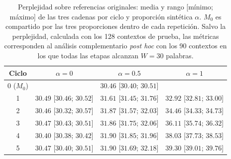 
\begin{table}[ht]
\centering
\footnotesize
\begin{tabular}{c c c c}
\hline
Ciclo & $\alpha=0$ & $\alpha=0.5$ & $\alpha=1$ \\
\hline
0 ($M_0$) & \multicolumn{3}{c}{$30.46$ [$30.40$; $30.51$]} \\
1 & $30.49$ [$30.46$; $30.52$] & $31.61$ [$31.45$; $31.76$] & $32.92$ [$32.81$; $33.00$] \\
2 & $30.46$ [$30.32$; $30.57$] & $31.87$ [$31.57$; $32.03$] & $34.46$ [$34.33$; $34.73$] \\
3 & $30.47$ [$30.43$; $30.51$] & $31.86$ [$31.75$; $32.06$] & $36.11$ [$35.74$; $36.32$] \\
4 & $30.40$ [$30.38$; $30.42$] & $31.90$ [$31.85$; $31.96$] & $38.03$ [$37.73$; $38.53$] \\
5 & $30.47$ [$30.40$; $30.51$] & $31.90$ [$31.69$; $32.18$] & $39.30$ [$39.01$; $39.76$] \\
\hline
\end{tabular}
\caption{Perplejidad sobre referencias originales: media y rango [mínimo; máximo] de las tres cadenas por ciclo y proporción sintética $\alpha$. $M_0$ es compartido por las tres proporciones dentro de cada repetición. Salvo la perplejidad, calculada con los 128 contextos de prueba, las métricas corresponden al análisis complementario \textit{post hoc} con los 90 contextos en los que todas las etapas alcanzan $W=30$ palabras.}
\label{tab:medias_human_perplexity}
\end{table}
